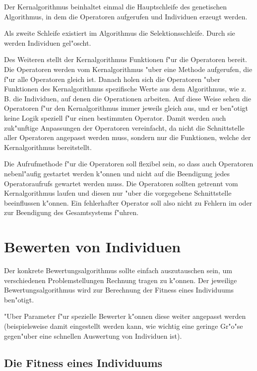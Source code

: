 \bigskip
Der Kernalgorithmus beinhaltet einmal die Hauptschleife des genetischen Algorithmus, in dem die Operatoren aufgerufen und Individuen erzeugt werden.

Als zweite Schleife existiert im Algorithmus die Selektionsschleife. Durch sie werden Individuen gel"oscht.

\bigskip
Des Weiteren stellt der Kernalgorithmus Funktionen f"ur die Operatoren bereit. Die Operatoren werden vom Kernalgorithmus "uber eine Methode aufgerufen, die f"ur alle Operatoren gleich ist. Danach holen sich die Operatoren "uber Funktionen des Kernalgorithmus spezifische Werte aus dem Algorithmus, wie z. B. die Individuen, auf denen die Operationen arbeiten. Auf diese Weise sehen die Operatoren f"ur den Kernalgorithmus immer jeweils gleich aus, und er ben"otigt keine Logik speziell f"ur einen bestimmten Operator. Damit werden auch zuk"unftige Anpassungen der Operatoren vereinfacht, da nicht die Schnittstelle aller Operatoren angepasst werden muss, sondern nur die Funktionen, welche der Kernalgorithmus bereitstellt.

Die Aufrufmethode f"ur die Operatoren soll flexibel sein, so dass auch Operatoren nebenl"aufig gestartet werden k"onnen und nicht auf die Beendigung jedes Operatoraufrufs gewartet werden muss. Die Operatoren sollten getrennt vom Kernalgorithmus laufen und diesen nur "uber die vorgegebene Schnittstelle beeinflussen k"onnen. Ein fehlerhafter Operator soll also nicht zu Fehlern im oder zur Beendigung des Gesamtsystems f"uhren.


\section{Bewerten von Individuen}

Der konkrete Bewertungsalgorithmus sollte einfach auszutauschen sein, um verschiedenen Problemstellungen Rechnung tragen zu k"onnen. Der jeweilige Bewertungsalgorithmus wird zur Berechnung der Fitness eines Individuums ben"otigt.

"Uber Parameter f"ur spezielle Bewerter k"onnen diese weiter angepasst werden (beispielsweise damit eingestellt werden kann, wie wichtig eine geringe Gr"o"se gegen"uber eine schnellen Auswertung von Individuen ist).


\subsection{Die Fitness eines Individuums}

